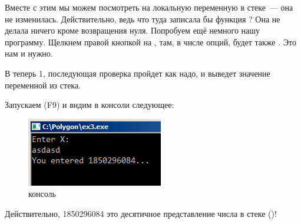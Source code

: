 Вместе с этим мы можем посмотреть на локальную переменную в стеке~--- она не изменилась.
Действительно, ведь что туда записала бы функция \scanf?
Она не делала ничего кроме возвращения нуля.
Попробуем ещё немного  нашу программу.
Щелкнем правой кнопкой на \EAX, там, в числе опций, будет также .
Это нам и нужно.

В \EAX теперь 1, последующая проверка пройдет как надо, и \printf выведет значение переменной из стека.

Запускаем (F9) и видим в консоли следующее:

\begin{figure}[H]
\centering
\includegraphics[scale=\FigScale]{patterns/04_scanf/3_checking_retval/olly_3.png}
\caption{консоль}
\end{figure}

Действительно, 1850296084 это десятичное представление числа в стеке ()!
